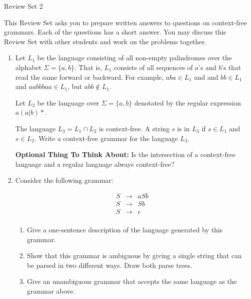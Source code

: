 \documentclass[12pt]{article}
\begin{document}
\begin{center}
{\large Review Set 2} 
\end{center}

This Review Set asks you to prepare written answers to questions on
context-free grammars. Each of the questions has a short answer. You may
discuss this Review Set with other students and work on the problems
together.  

\begin{enumerate}

\item Let $L_1$ be the language consisting of all non-empty palindromes
over the alphabet $\Sigma = \{a, b\}$.  That is, $L_1$ consists of all
sequences of $a$'s and $b$'s that read the same forward or backward.  For
example, $aba \in L_1$ and and $bb \in L_1$ and $aabbbaa \in L_1$, but $abb
\notin L_1$. 

Let $L_2$ be the language over $\Sigma = \{a, b\}$ denotated by the regular
expression $a(a|b)*$. 

The language $L_3 = L_1 \cap L_2$ is context-free. A string $s$ is in $L_3$
if $s \in L_1$ and $s \in L_2$. Write a context-free grammar for the
language $L_3$. 

{\bf Optional Thing To Think About:} Is the intersection of a context-free
language and a regular language always context-free? 

\item Consider the following grammar:

\begin{eqnarray*}
S & \rightarrow & aSb \\
S & \rightarrow &  Sb\\
S & \rightarrow & \epsilon \\
\end{eqnarray*}

\begin{enumerate}

\item Give a one-sentence description of the language generated by this
grammar.

\item Show that this grammar is ambiguous by giving a single string that
can be parsed in two different ways.  Draw both parse trees.

\item Give an unambiguous grammar that accepts the same language as the
grammar above.

\end{enumerate}


\end{enumerate}
\end{document}
